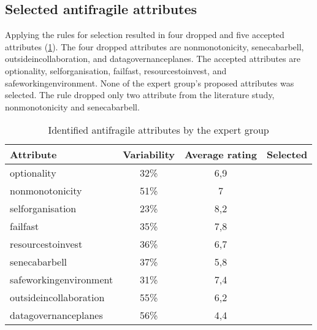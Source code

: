 \subsection{Selected antifragile attributes}
\label{sub:validationselectedafattributes}
Applying the rules for selection resulted in four dropped and five accepted \glspl{attribute} (\cref{tab:expertgrouppossiblesf}). The four dropped \glspl{attribute} are \gls{nonmonotonicity}, \gls{senecabarbell}, \gls{outsideincollaboration}, and \gls{datagovernanceplanes}. The accepted \glspl{attribute} are \gls{optionality}, \gls{selforganisation}, \gls{failfast}, \gls{resourcestoinvest}, and \gls{safeworkingenvironment}. None of the expert group's proposed \glspl{attribute} was selected. The rule dropped only two \gls{attribute} from the literature study, \gls{nonmonotonicity} and \gls{senecabarbell}.
{\small\tabcolsep=3pt  %
\begin{longtable}{@{}lccc@{}}
	\toprule%
	\textbf{Attribute} & \textbf{Variability} & \textbf{Average rating} & \textbf{Selected} \\%
	\midrule%
	\endhead%
	\hline
	\endfoot%
	\caption[Identified antifragile attributes by the expert group]{Identified antifragile attributes by the expert group}
	\label{tab:expertgrouppossiblesf}
	\endlastfoot%
	\Gls{optionality} & 32\% & 6,9 & \checkmark \\%
	\Gls{nonmonotonicity} & 51\% & 7 &  \\%
	\Gls{selforganisation} & 23\% & 8,2 & \checkmark  \\%
	\Gls{failfast} & 35\% & 7,8 & \checkmark  \\%
	\Gls{resourcestoinvest} & 36\% & 6,7 & \checkmark \\%
	\Gls{senecabarbell} & 37\% & 5,8 &  \\%
	\Gls{safeworkingenvironment} & 31\% & 7,4 & \checkmark  \\%
	\Gls{outsideincollaboration} & 55\% & 6,2 &  \\%
	\Gls{datagovernanceplanes} & 56\% & 4,4 &  \\%
	\bottomrule%
\end{longtable}%
}%
